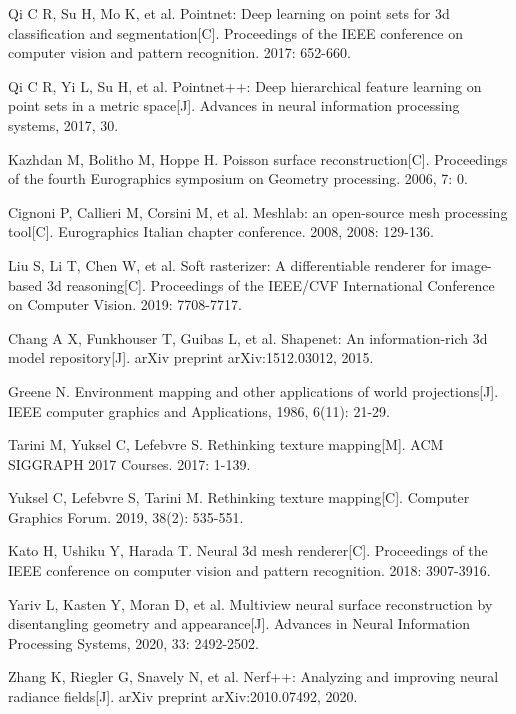 Qi C R, Su H, Mo K, et al. Pointnet: Deep learning on point sets for 3d classification and segmentation[C]. Proceedings of the IEEE conference on computer vision and pattern recognition. 2017: 652-660.


Qi C R, Yi L, Su H, et al. Pointnet++: Deep hierarchical feature learning on point sets in a metric space[J]. Advances in neural information processing systems, 2017, 30.

Kazhdan M, Bolitho M, Hoppe H. Poisson surface reconstruction[C]. Proceedings of the fourth Eurographics symposium on Geometry processing. 2006, 7: 0.

Cignoni P, Callieri M, Corsini M, et al. Meshlab: an open-source mesh processing tool[C]. Eurographics Italian chapter conference. 2008, 2008: 129-136.

Liu S, Li T, Chen W, et al. Soft rasterizer: A differentiable renderer for image-based 3d reasoning[C]. Proceedings of the IEEE/CVF International Conference on Computer Vision. 2019: 7708-7717.

Chang A X, Funkhouser T, Guibas L, et al. Shapenet: An information-rich 3d model repository[J]. arXiv preprint arXiv:1512.03012, 2015.

Greene N. Environment mapping and other applications of world projections[J]. IEEE computer graphics and Applications, 1986, 6(11): 21-29.

 Tarini M, Yuksel C, Lefebvre S. Rethinking texture mapping[M]. ACM SIGGRAPH 2017 Courses. 2017: 1-139.

Yuksel C, Lefebvre S, Tarini M. Rethinking texture mapping[C]. Computer Graphics Forum. 2019, 38(2): 535-551.

Kato H, Ushiku Y, Harada T. Neural 3d mesh renderer[C]. Proceedings of the IEEE conference on computer vision and pattern recognition. 2018: 3907-3916.

Yariv L, Kasten Y, Moran D, et al. Multiview neural surface reconstruction by disentangling geometry and appearance[J]. Advances in Neural Information Processing Systems, 2020, 33: 2492-2502.

Zhang K, Riegler G, Snavely N, et al. Nerf++: Analyzing and improving neural radiance fields[J]. arXiv preprint arXiv:2010.07492, 2020.

